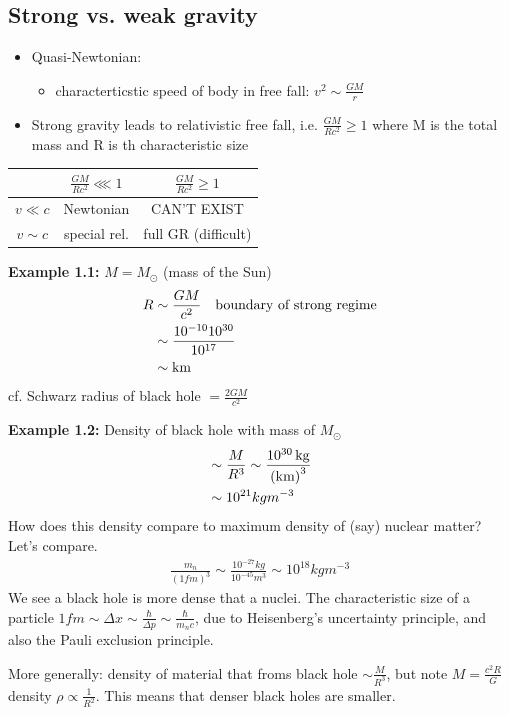 \documentclass[a4paper]{article} %
\newcommand{\example}[2]
{
\begin{framed}
\textbf{Example #1:} #2
\end{framed}
}
\begin{document}
\subsection{Strong vs. weak gravity}
\begin{itemize}
\item Quasi-Newtonian:
\begin{itemize}
\item characterticstic speed of body in free fall: $v^2\sim \frac{GM}{r}$
\end{itemize}
\item Strong gravity leads to relativistic free fall, i.e. $\frac{GM}{Rc^2}\geq 1$ where M is the total mass and R is th characteristic size
\end{itemize}

\begin{table}
\centering
\begin{tabular}{c|cc} 
 & $\frac{GM}{Rc^2} \lll 1$ & $\frac{GM}{Rc^2}\geq 1$\\
\hline $v \ll c$ & Newtonian & CAN'T EXIST \\
$v\sim c$ & special rel. & full GR (difficult)
\end{tabular}
\end{table}

\example{1.1}{
$M=M_{\odot}$ (mass of the Sun)
\begin{align*}
R & \sim \frac{GM}{c^2} \text{\quad boundary of strong regime}\\
&\sim \frac{10^{-10}10^{30}}{10^{17}}\\
&\sim \text{km}
\end{align*}
cf. Schwarz radius of black hole $=\frac{2GM}{c^2}$
}
\example{1.2}{
Density of black hole with mass of $M_\odot$
\begin{align*}
&\sim \frac{M}{R^3}\sim\frac{\SI{d30}{kg}}{\si{(km)^3}}\\
&\sim 10^{21}kgm^{-3}
\end{align*}
How does this density compare to maximum density of (say) nuclear matter? Let's compare.
\begin{align*}
\frac{m_n}{(1fm)^3}\sim \frac{10^{-27}kg}{10^{-45}m^3}\sim 10^{18}kgm^{-3}
\end{align*}
We see a black hole is more dense that a nuclei. The characteristic size of a particle $1fm\sim\Delta x\sim \frac{\hbar}{\Delta p}\sim \frac{\hbar}{m_n c}$, due to Heisenberg's uncertainty principle, and also the Pauli exclusion principle.
}
More generally: density of material that froms black hole $\sim\frac{M}{R^3}$, but note $M=\frac{c^2R}{G}$ density $\rho \propto \frac{1}{R^2}$. This means that denser black holes are smaller.
\end{document}
